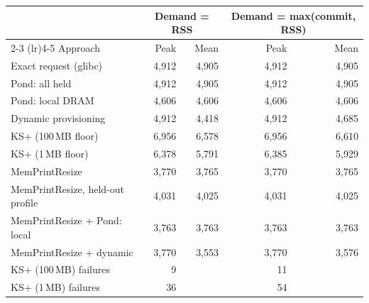\begin{tabular}{lrrrr}
\toprule
 & \multicolumn{2}{c}{Demand = RSS} & \multicolumn{2}{c}{Demand = max(commit, RSS)} \\
\cmidrule(lr){2-3} \cmidrule(lr){4-5}
Approach & Peak & Mean & Peak & Mean \\
\midrule
Exact request (glibc) & 4{,}912 & 4{,}905 & 4{,}912 & 4{,}905 \\
Pond: all held & 4{,}912 & 4{,}905 & 4{,}912 & 4{,}905 \\
Pond: local DRAM & 4{,}606 & 4{,}606 & 4{,}606 & 4{,}606 \\
Dynamic provisioning & 4{,}912 & 4{,}418 & 4{,}912 & 4{,}685 \\
KS+ (100\,MB floor) & 6{,}956 & 6{,}578 & 6{,}956 & 6{,}610 \\
KS+ (1\,MB floor) & 6{,}378 & 5{,}791 & 6{,}385 & 5{,}929 \\
MemPrintResize & 3{,}770 & 3{,}765 & 3{,}770 & 3{,}765 \\
MemPrintResize, held-out profile & 4{,}031 & 4{,}025 & 4{,}031 & 4{,}025 \\
MemPrintResize + Pond: local & 3{,}763 & 3{,}763 & 3{,}763 & 3{,}763 \\
MemPrintResize + dynamic & 3{,}770 & 3{,}553 & 3{,}770 & 3{,}576 \\
\midrule
KS+ (100\,MB) failures & 9 &  & 11 &  \\
KS+ (1\,MB) failures & 36 &  & 54 &  \\
\bottomrule
\end{tabular}
